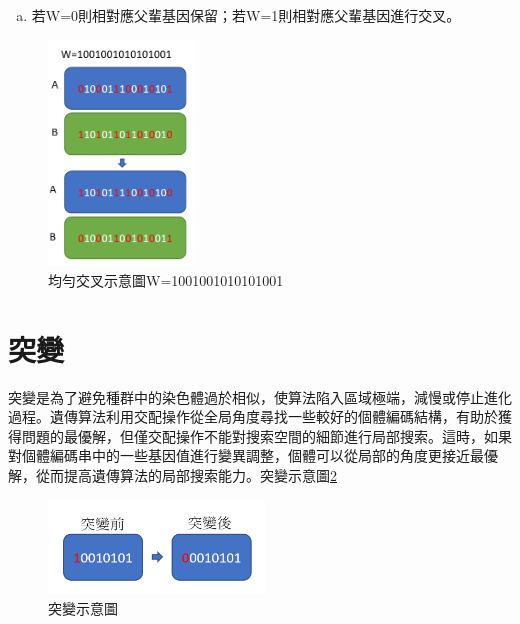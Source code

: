 \begin{enumerate}
\begin{enumerate}[(a)]
		      \item
		            若W=0則相對應父輩基因保留；若W=1則相對應父輩基因進行交叉。
	      \end{enumerate}
	      \begin{figure}[H]
		      \centerline{\includegraphics[height=6cm]{pic/AVG.PNG}}
		      \caption{均勻交叉示意圖W=1001001010101001}
		      \label{fig:avg}
	      \end{figure}


\end{enumerate}




\section{突變}
突變是為了避免種群中的染色體過於相似，使算法陷入區域極端，減慢或停止進化過程。遺傳算法利用交配操作從全局角度尋找一些較好的個體編碼結構，有助於獲得問題的最優解，但僅交配操作不能對搜索空間的細節進行局部搜索。這時，如果對個體編碼串中的一些基因值進行變異調整，個體可以從局部的角度更接近最優解，從而提高遺傳算法的局部搜索能力。突變示意圖\ref{fig:GAmut}

\begin{figure}[H]
	\centerline{\includegraphics[height=2.5cm]{pic/GAmut.PNG}}
	\caption{突變示意圖}
	\label{fig:GAmut}
\end{figure}
